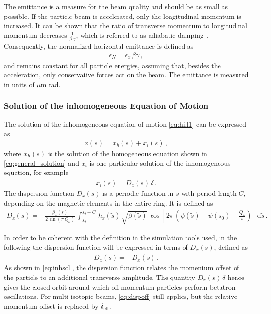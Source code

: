 The emittance is a measure for the beam quality and should be as small as possible. If the particle beam is accelerated, only the longitudinal momentum is increased. It can be shown that the ratio of transverse momentum to longitudinal momentum decreases $\frac{1}{\beta \, \gamma}$, which is referred to as adiabatic damping~\cite{wiedemann1999particle}. Consequently, the normalized horizontal emittance is defined as 
%
\begin{align}
  \epsilon_N = \epsilon_x \, \beta \gamma \, ,
\end{align}
and remains constant for all particle energies, assuming that, besides the acceleration, only conservative forces  act on the beam. The emittance is measured in units of $\mu$m rad.




\subsubsection{Solution of the inhomogeneous Equation of Motion}


The solution of the inhomogeneous equation of motion \eqref{eq:hill1} can be expressed as
%
\begin{align}
  x(s) = x_h(s) + x_i(s) \, , \label{eq:inhsol}
\end{align}
%
where $x_h(s)$ is the solution of the homogeneous equation shown in \eqref{eq:general_solution} and $x_i$ is one particular solution of the inhomogeneous equation, for example
%
\begin{align}
  x_i(s) = \bar{D}_x(s) \, \delta \, .
\end{align}
%
The dispersion function $\bar{D}_x(s)$ is a periodic function in $s$ with period length $C$, depending on the magnetic elements in the entire ring. It is defined as
%
\begin{align}
  \bar{D}_x (s) = - \frac{\beta_x(s)}{2 \, \sin (\pi \, Q_x)} \, \int_{s_0}^{s_0+C} \, h_x(\tilde{s}) \, \sqrt{\beta(\tilde{s})} \, \cos \left[ 2 \pi \, \left( \psi(\tilde{s}) - \psi(s_0) - \frac{Q_x}{s} \right) \right] \, \mathrm{d} \tilde{s} \, .
\end{align}

In order to be coherent with the definition in the simulation tools used, in the following the dispersion function will be expressed in terms of $D_x(s)$, defined as
%
\begin{align}
  D_x(s) = -\bar{D}_x(s) \, . \label{eq:dispoff}
\end{align}
%
As shown in \eqref{eq:inhsol}, the dispersion function relates the momentum offset of the particle to an additional transverse amplitude. The quantity $D_x (s) \, \delta$ hence gives the closed orbit around which  off-momentum particles perform betatron oscillations. For multi-isotopic beams, \eqref{eq:dispoff} still applies, but the relative momentum offset is replaced by $\delta_\text{eff}$.

